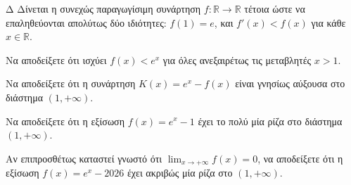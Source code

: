 \begin{thema}{Δ}
Δίνεται η συνεχώς παραγωγίσιμη συνάρτηση $f: \mathbb{R} \to \mathbb{R}$ τέτοια ώστε να επαληθεύονται απολύτως δύο ιδιότητες: $f(1)=e$, και $f'(x) < f(x)$ για κάθε $x \in \mathbb{R}$.
\begin{erwthma}
    \item Να αποδείξετε ότι ισχύει $f(x) < e^x$ για όλες ανεξαιρέτως τις μεταβλητές $x > 1$. 
    \item Να αποδείξετε ότι η συνάρτηση $K(x) = e^x - f(x)$ είναι γνησίως αύξουσα στο διάστημα $(1, +\infty)$. 
    \item Να αποδείξετε ότι η εξίσωση $f(x) = e^x - 1$ έχει το πολύ μία ρίζα στο διάστημα $(1, +\infty)$. 
    \item Αν επιπροσθέτως καταστεί γνωστό ότι $\displaystyle\lim_{x\to+\infty} f(x) = 0$, να αποδείξετε ότι η εξίσωση $f(x) = e^x - 2026$ έχει ακριβώς μία ρίζα στο $(1, +\infty)$. 
\end{erwthma}
\end{thema}
